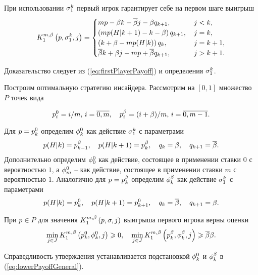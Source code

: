 \begin{proposition}
  При использовании $\fGeneral{k}$ первый игрок гарантирует себе на первом шаге
  выигрыш
  \begin{equation}
    \label{eq:lowerPayoffGeneral}
    \firstPlayerPayoff{1}{p}{\fGeneral{k}}{j} =
    \begin{cases}
      mp - \Co k - \DCo j - \Co q_{k+1},      & \, j < k,     \\
      \left(m p(H|k+1) - k - \Co \right) q_{k+1}, & \, j = k,     \\
      \left(k + \Co - m p(H|k) \right) q_k,       & \, j = k + 1, \\
      \DCo k + \Co j - mp + \DCo q_{k+1}, & \, j > k + 1.
    \end{cases}
  \end{equation}
\end{proposition}

Доказательство следует из (\ref{eq:firstPlayerPayoff}) и определения
$\fGeneral{k}$.

Построим оптимальную стратегию инсайдера. Рассмотрим на $[0,1]$ множество $P$
точек вида

\[
\pEven[i] = i/m, \, i = \overline{0, m}, \quad \pOdd[i] = (i + \Co)/m, \, i =
\overline{0, m - 1}.
\]

Для $p = \pEven$ определим $\fEven$ как действие $\fGeneral{k}$ с параметрами
\begin{equation*}
  p(H|k) = \pOdd[k-1], \quad p(H|k + 1) = \pOdd[k], \quad q_k = \Co, \quad q_{k+1} = \DCo.
\end{equation*}
Дополнительно определим $\fEven[0]$ как действие, состоящее в применении ставки
$0$ с вероятностью $1$, а $\fEven[m]$ -- как действие, состоящее в применении
ставки $m$ с вероятностью $1$. Аналогично для $p = \pOdd$ определим $\fOdd$ как
действие $\fGeneral{k}$ с параметрами
\begin{equation*}
  p(H|k) = \pEven[k], \quad p(H|k + 1) = \pEven[k+1], \quad q_k = \DCo, \quad q_{k+1} = \Co.
\end{equation*}

\begin{proposition}
  При $p \in P$ для значения $\firstPlayerPayoff{1}{p}{\sigma}{j}$ выигрыша
  первого игрока верны оценки
  \begin{equation}
    \label{eq:lowerBound:inequalities}
    \min_{j \in J}
    \firstPlayerPayoff{1}{\pEven}{\fEven}{j} \geq 0,
    \quad
    \min_{j \in J}
    \firstPlayerPayoff{1}{\pOdd}{\fOdd}{j} \geq \DCo\Co.
  \end{equation}
\end{proposition}
Справедливость утверждения устанавливается подстановкой $\fEven$ и $\fOdd$ в
(\ref{eq:lowerPayoffGeneral}).


